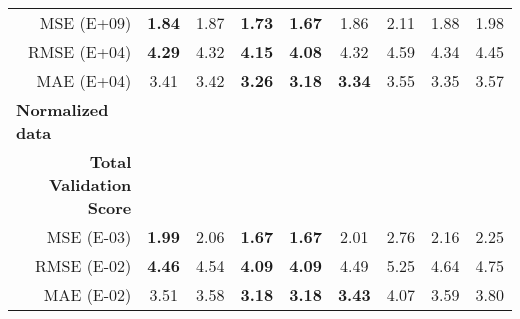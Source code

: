 \begin{table}[htbp]
\begin{tabular}{r|cccccccc}
        MSE (E+09)   & \textbf{1.84} & 1.87  & \textbf{1.73} & \textbf{1.67} & 1.86  & 2.11  & 1.88  & 1.98 \\
        RMSE (E+04)   & \textbf{4.29} & 4.32  & \textbf{4.15} & \textbf{4.08} & 4.32  & 4.59  & 4.34  & 4.45 \\
        MAE (E+04)   & 3.41  & 3.42  & \textbf{3.26} & \textbf{3.18} & \textbf{3.34} & 3.55  & 3.35  & 3.57 \\
        \midrule
        \multicolumn{1}{l|}{\textbf{Normalized data}} &       &       &       &       &       &       &       &  \\
        \textbf{Total Validation Score         } &       &       &       &       &       &       &       &  \\
        MSE (E-03)   & \textbf{1.99} & 2.06  & \textbf{1.67} & \textbf{1.67} & 2.01  & 2.76  & 2.16  & 2.25 \\
        RMSE (E-02)   & \textbf{4.46} & 4.54  & \textbf{4.09} & \textbf{4.09} & 4.49  & 5.25  & 4.64  & 4.75 \\
        MAE (E-02)   & 3.51  & 3.58  & \textbf{3.18} & \textbf{3.18} & \textbf{3.43} & 4.07  & 3.59  & 3.80 \\
    \end{tabular}%
  \label{table4}%
\end{table}%




